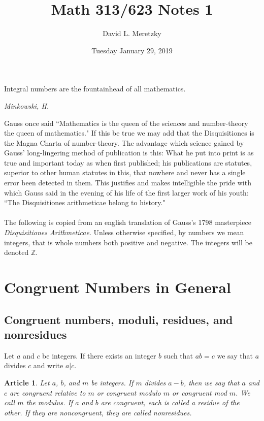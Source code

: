 \documentclass{article}
\title{ \vspace{-10ex} %
Math 313/623 Notes 1
}
\author{David L. Meretzky
}
\date{%
Tuesday January 29, 2019
}
\theoremstyle{problemstyle}
\newtheorem{article}{Article}
\begin{document}
\maketitle

\epigraph{Integral numbers are the fountainhead of all mathematics.}{\textit{Minkowski, H.}}

Gauss once said ``Mathematics is the queen of the sciences and number-theory the queen of mathematics." If this be true we may add that the Disquisitiones is the Magna Charta of number-theory. The advantage which science gained by Gauss' long-lingering method of publication is this: What he put into print is as true and important today as when first published; his publications are statutes, superior to other human statutes in this, that nowhere and never has a single error been detected in them. This justifies and makes intelligible the pride with which Gauss said in the evening of his life of the first larger work of his youth: ``The Disquisitiones arithmeticae belong to history."
\\[5pt]
\\

The following is copied from an english translation of Gauss's 1798 masterpiece \textit{Disquisitiones Arithmeticae}. Unless otherwise specified, by numbers we mean integers, that is whole numbers both positive and negative. The integers will be denoted $\mathbb{Z}$. 
\section{Congruent Numbers in General}

\subsection{Congruent numbers, moduli, residues, and nonresidues}

Let $a$ and $c$ be integers. If there exists an integer $b$ such that $ab = c$ we say that $a$ divides $c$ and write $a|c$.  

\begin{article}
Let $a$, $b$, and $m$ be integers. If $m$ divides $a-b$, then we say that $a$ and $c$ are \textit{congruent relative to $m$} or \textit{congruent modulo $m$} or \textit{congruent mod $m$}. We call $m$ the \textit{modulus}. If $a$ and $b$ are congruent, each is called a \textit{residue} of the other. If they are noncongruent, they are called nonresidues.     
\end{article}
\end{document}
